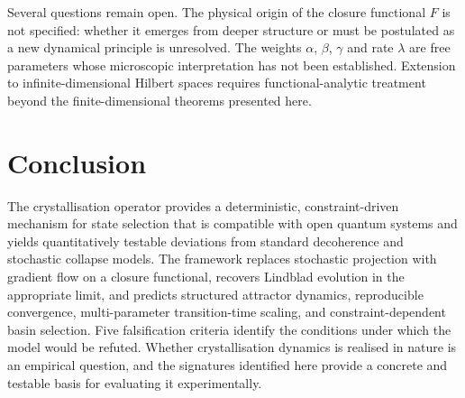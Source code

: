 \documentclass[12pt]{article}
\begin{document}
Several questions remain open. The physical origin of the closure functional $F$ is not specified: whether it emerges from deeper structure or must be postulated as a new dynamical principle is unresolved. The weights $\alpha$, $\beta$, $\gamma$ and rate $\lambda$ are free parameters whose microscopic interpretation has not been established. Extension to infinite-dimensional Hilbert spaces requires functional-analytic treatment beyond the finite-dimensional theorems presented here.

\section{Conclusion}

The crystallisation operator provides a deterministic, constraint-driven mechanism for state selection that is compatible with open quantum systems and yields quantitatively testable deviations from standard decoherence and stochastic collapse models. The framework replaces stochastic projection with gradient flow on a closure functional, recovers Lindblad evolution in the appropriate limit, and predicts structured attractor dynamics, reproducible convergence, multi-parameter transition-time scaling, and constraint-dependent basin selection. Five falsification criteria identify the conditions under which the model would be refuted. Whether crystallisation dynamics is realised in nature is an empirical question, and the signatures identified here provide a concrete and testable basis for evaluating it experimentally.



\end{document}
